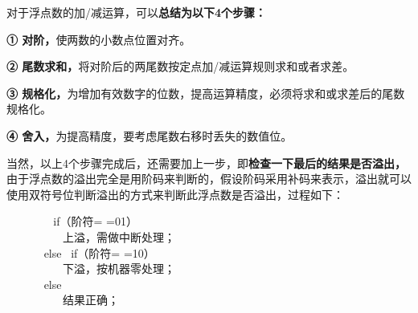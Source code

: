 对于浮点数的加/减运算，可以\textbf{{总结为以下4个步骤：}}

\textbf{① 对阶，}使两数的小数点位置对齐。

\textbf{② 尾数求和，}将对阶后的两尾数按定点加/减运算规则求和或者求差。

\textbf{③
规格化，}为增加有效数字的位数，提高运算精度，必须将求和或求差后的尾数规格化。

\textbf{④ 舍入，}为提高精度，要考虑尾数右移时丢失的数值位。

当然，以上4个步骤完成后，还需要加上一步，即\textbf{{检查一下最后的结果是否溢出，}}由于浮点数的溢出完全是用阶码来判断的，假设阶码采用补码来表示，溢出就可以使用双符号位判断溢出的方式来判断此浮点数是否溢出，过程如下：

~ ~ ~ ~ ~ if（阶符= =01）\\
\hspace*{0.333em} ~ ~ ~ ~ ~ ~ 上溢，需做中断处理；\\
\hspace*{0.333em} ~ ~ ~ ~ else ~if（阶符= =10）\\
\hspace*{0.333em} ~ ~ ~ ~ ~ ~ 下溢，按机器零处理；\\
\hspace*{0.333em} ~ ~ ~ ~ else\\
\hspace*{0.333em} ~ ~ ~ ~ ~ ~ 结果正确；\\
